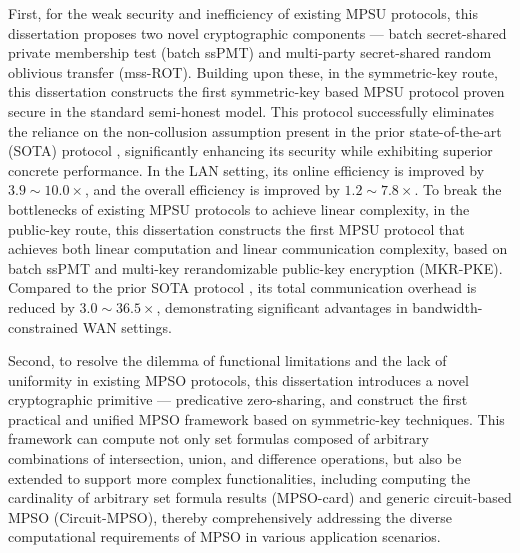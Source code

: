 \begin{enabstract}
    First, for the weak security and inefficiency of existing MPSU protocols, this dissertation proposes two novel cryptographic components ---  batch secret-shared private membership test (batch ssPMT) and multi-party secret-shared random oblivious transfer (mss-ROT). Building upon these, in the symmetric-key route, this dissertation constructs the first symmetric-key based MPSU protocol proven secure in the standard semi-honest model. This protocol successfully eliminates the reliance on the non-collusion assumption present in the prior state-of-the-art (SOTA) protocol \cite{LG-ASIACRYPT-2023}, significantly enhancing its security while exhibiting superior concrete performance. In the LAN setting, its online efficiency is improved by $3.9 \sim 10.0 \times$, and the overall efficiency is improved by $1.2 \sim 7.8 \times$. 
    To break the bottlenecks of existing MPSU protocols to achieve linear complexity, in the public-key route, this dissertation constructs the first MPSU protocol that achieves both linear computation and linear communication complexity, based on batch ssPMT and multi-key rerandomizable public-key encryption (MKR-PKE). Compared to the prior SOTA protocol \cite{LG-ASIACRYPT-2023}, its total communication overhead is reduced by $3.0 \sim 36.5 \times$, demonstrating significant advantages in bandwidth-constrained WAN settings.

    Second, to resolve the dilemma of functional limitations and the lack of uniformity in existing MPSO protocols, this dissertation introduces a novel cryptographic primitive --- predicative zero-sharing, and construct the first practical and unified MPSO framework based on symmetric-key techniques. This framework can compute not only set formulas composed of arbitrary combinations of intersection, union, and difference operations, but also be extended to support more complex functionalities, including computing the cardinality of arbitrary set formula results (MPSO-card) and generic circuit-based MPSO (Circuit-MPSO), thereby comprehensively addressing the diverse computational requirements of MPSO in various application scenarios.


\end{enabstract}

